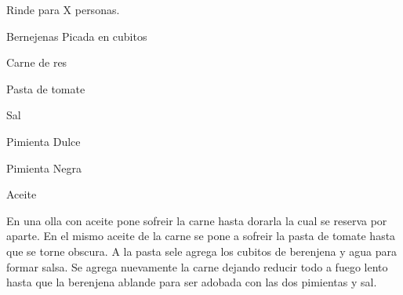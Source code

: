 
Rinde para X personas.


\begin{ingredientes}
\item Bernejenas Picada en cubitos
\item Carne de res
\item Pasta de tomate
\item Sal
\item Pimienta Dulce
\item Pimienta Negra
\item Aceite
\end{ingredientes}
\preparacion

En una olla con aceite pone sofreir la carne hasta dorarla la cual se reserva por aparte. En el mismo aceite de la carne se pone a sofreir la pasta de tomate hasta que se torne obscura. A la pasta sele agrega los cubitos de berenjena y agua para formar salsa. Se agrega nuevamente la carne dejando reducir todo a fuego lento hasta que la berenjena ablande para ser adobada con las dos pimientas y sal.
